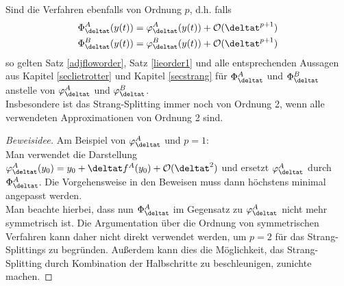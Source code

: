 \begin{maththeorem}
Sind die Verfahren ebenfalls von Ordnung $p$, d.h. falls 
\begin{align*}
\Phi_{\deltat}^A(y(t))=\varphi_{\deltat}^A(y(t))+\mathcal{O}(\deltat^{p+1})\\
\Phi_{\deltat}^B(y(t))=\varphi_{\deltat}^B(y(t))+\mathcal{O}(\deltat^{p+1})
\end{align*}
so gelten Satz \ref{adjfloworder}, Satz \ref{lieorder1} und alle entsprechenden Aussagen aus Kapitel \ref{seclietrotter} und Kapitel \ref{secstrang} für $\Phi_{\deltat}^A$ und $\Phi_{\deltat}^B$ anstelle von $\varphi_{\deltat}^A$ und $\varphi_{\deltat}^B$.\\
Insbesondere ist das Strang-Splitting immer noch von Ordnung 2, wenn alle verwendeten Approximationen von Ordnung 2 sind.
\end{maththeorem}
\begin{proof}[Beweisidee]
Am Beispiel von $\varphi_{\deltat}^A$ und $p=1$:\\
Man verwendet die Darstellung $\varphi_{\deltat}^A(y_0)=y_0+\deltat f^A(y_0)+\mathcal{O}(\deltat^2)$ und ersetzt $\varphi_{\deltat}^A$ durch $\Phi_{\deltat}^A$. Die Vorgehensweise in den Beweisen muss dann höchstens minimal angepasst werden.\\
Man beachte hierbei, dass nun $\Phi_{\deltat}^A$ im Gegensatz zu $\varphi_{\deltat}^A$ nicht mehr symmetrisch ist. Die Argumentation über die Ordnung von symmetrischen Verfahren kann daher nicht direkt verwendet werden, um $p=2$ für das Strang-Splittings zu begründen. Außerdem kann dies die Möglichkeit, das Strang-Splitting durch Kombination der Halbschritte zu beschleunigen, zunichte machen.
\end{proof}

